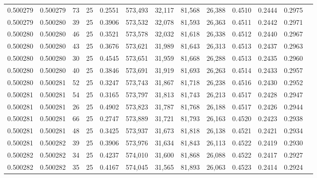 \begin{tabular}{rrrrrrrrrrrrr}
0.500279 & 0.500279 &    73 &  25 &                                     0.2551 & 573,493 &  32,117 &  81,568 &  26,388 & 0.4510 & 0.2444 & 0.2975 \\
0.500279 & 0.500280 &    39 &  25 &                                     0.3906 & 573,532 &  32,078 &  81,593 &  26,363 & 0.4511 & 0.2442 & 0.2971 \\
0.500280 & 0.500280 &    46 &  25 &                                     0.3521 & 573,578 &  32,032 &  81,618 &  26,338 & 0.4512 & 0.2440 & 0.2967 \\
0.500280 & 0.500280 &    43 &  25 &                                     0.3676 & 573,621 &  31,989 &  81,643 &  26,313 & 0.4513 & 0.2437 & 0.2963 \\
0.500280 & 0.500280 &    30 &  25 &                                     0.4545 & 573,651 &  31,959 &  81,668 &  26,288 & 0.4513 & 0.2435 & 0.2960 \\
0.500280 & 0.500280 &    40 &  25 &                                     0.3846 & 573,691 &  31,919 &  81,693 &  26,263 & 0.4514 & 0.2433 & 0.2957 \\
0.500280 & 0.500281 &    52 &  25 &                                     0.3247 & 573,743 &  31,867 &  81,718 &  26,238 & 0.4516 & 0.2430 & 0.2952 \\
0.500281 & 0.500281 &    54 &  25 &                                     0.3165 & 573,797 &  31,813 &  81,743 &  26,213 & 0.4517 & 0.2428 & 0.2947 \\
0.500281 & 0.500281 &    26 &  25 &                                     0.4902 & 573,823 &  31,787 &  81,768 &  26,188 & 0.4517 & 0.2426 & 0.2944 \\
0.500281 & 0.500281 &    66 &  25 &                                     0.2747 & 573,889 &  31,721 &  81,793 &  26,163 & 0.4520 & 0.2423 & 0.2938 \\
0.500281 & 0.500281 &    48 &  25 &                                     0.3425 & 573,937 &  31,673 &  81,818 &  26,138 & 0.4521 & 0.2421 & 0.2934 \\
0.500281 & 0.500282 &    39 &  25 &                                     0.3906 & 573,976 &  31,634 &  81,843 &  26,113 & 0.4522 & 0.2419 & 0.2930 \\
0.500282 & 0.500282 &    34 &  25 &                                     0.4237 & 574,010 &  31,600 &  81,868 &  26,088 & 0.4522 & 0.2417 & 0.2927 \\
0.500282 & 0.500282 &    35 &  25 &                                     0.4167 & 574,045 &  31,565 &  81,893 &  26,063 & 0.4523 & 0.2414 & 0.2924 \\

\end{tabular}
